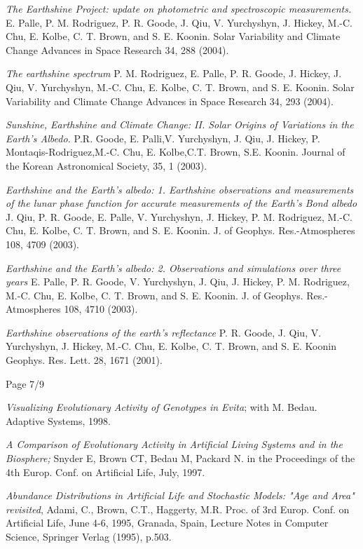 \documentclass[margin,line]{resume}
\begin{document}
\begin{resume}
{\em The Earthshine Project: update on photometric and spectroscopic measurements.}
 E. Palle, P. M. Rodriguez, P. R. Goode, J. Qiu, V. Yurchyshyn, J. Hickey, M.-C. Chu, E. Kolbe, C. T. Brown, and S. E. Koonin.
Solar Variability and Climate Change Advances in Space Research 34, 288 (2004).

{\em The earthshine spectrum}
P. M. Rodriguez, E. Palle, P. R. Goode, J. Hickey, J. Qiu, V. Yurchyshyn, M.-C. Chu, E. Kolbe, C. T. Brown, and S. E. Koonin.
Solar Variability and Climate Change Advances in Space Research 34, 293 (2004).

{\em Sunshine, Earthshine and Climate Change: II. Solar Origins of Variations in the Earth's Albedo.}  P.R. Goode, E. Palli,V. Yurchyshyn, J. Qiu,
 J. Hickey, P. Montaqis-Rodriguez,M.-C. Chu,
 E. Kolbe,C.T. Brown, S.E. Koonin.
Journal of the Korean Astronomical Society, 35, 1 (2003).

{\em Earthshine and the Earth's albedo: 1. Earthshine observations and measurements of the lunar phase function for accurate measurements of the Earth's Bond albedo}
J. Qiu, P. R. Goode, E. Palle, V. Yurchyshyn, J. Hickey, P. M. Rodriguez, M.-C. Chu, E. Kolbe, C. T. Brown, and S. E. Koonin.
J. of Geophys. Res.-Atmospheres 108, 4709 (2003).

{\em Earthshine and the Earth's albedo: 2. Observations and simulations over three years}
 E. Palle, P. R. Goode, V. Yurchyshyn, J. Qiu, J. Hickey, P. M. Rodriguez, M.-C. Chu, E. Kolbe, C. T. Brown, and S. E. Koonin.
J. of Geophys. Res.-Atmospheres 108, 4710 (2003).


{\em Earthshine observations of the earth's reflectance}
P. R. Goode, J. Qiu, V. Yurchyshyn, J. Hickey, M.-C. Chu, E. Kolbe, C. T. Brown, and S. E. Koonin
Geophys. Res. Lett. 28, 1671 (2001).

\vspace{1cm}
{\centerline {Page 7/9}}

\newpage

{\em Visualizing Evolutionary Activity of Genotypes in Evita};
with M. Bedau.  Adaptive Systems, 1998.

{\em A Comparison of Evolutionary Activity in Artificial Living Systems and in the 
	Biosphere;} Snyder E, Brown CT, Bedau M, Packard N.
in the Proceedings of the 4th Europ. Conf. on 
Artificial Life, July, 1997.

{\em Abundance Distributions in Artificial Life and Stochastic Models: "Age and
Area" revisited}, Adami, C., Brown, C.T., Haggerty, M.R.
Proc. of 3rd Europ. Conf. on Artificial Life, June 4-6, 1995,
Granada, Spain, Lecture Notes in Computer Science, Springer Verlag (1995),
p.503.


\end{resume}
\end{document}
